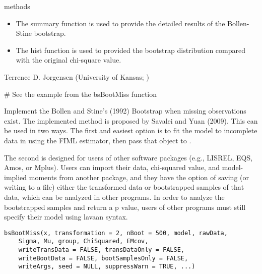\documentclass[a4paper]{book}
\begin{document}
%
\begin{Section}{methods}
\begin{itemize}

\item {} The summary function is used to provide the detailed results of the Bollen-Stine bootstrap.  
\item {} The hist function is used to provided the bootstrap distribution compared with the original chi-square value.

\end{itemize}

\end{Section}
%
\begin{Author}\relax
Terrence D. Jorgensen (University of Kansas; )
\end{Author}
%
\begin{SeeAlso}\relax
{}
\end{SeeAlso}
%
\begin{Examples}
\begin{ExampleCode}
# See the example from the bsBootMiss function
\end{ExampleCode}
\end{Examples}
%
\begin{Description}\relax
Implement the Bollen and Stine's (1992) Bootstrap when missing observations exist. The implemented method is proposed by Savalei and Yuan (2009). This can be used in two ways. The first and easiest option is to fit the model to incomplete data in  using the FIML estimator, then pass that  object to . 

The second is designed for users of other software packages (e.g., LISREL, EQS, Amos, or Mplus). Users can import their data, chi-squared value, and model-implied moments from another package, and they have the option of saving (or writing to a file) either the transformed data or bootstrapped samples of that data, which can be analyzed in other programs. In order to analyze the bootstrapped samples and return a p value, users of other programs must still specify their model using lavaan syntax.
\end{Description}
%
\begin{Usage}
\begin{verbatim}
bsBootMiss(x, transformation = 2, nBoot = 500, model, rawData,
	Sigma, Mu, group, ChiSquared, EMcov,
	writeTransData = FALSE, transDataOnly = FALSE,
	writeBootData = FALSE, bootSamplesOnly = FALSE,
	writeArgs, seed = NULL, suppressWarn = TRUE, ...)
\end{verbatim}
\end{Usage}
\end{document}
